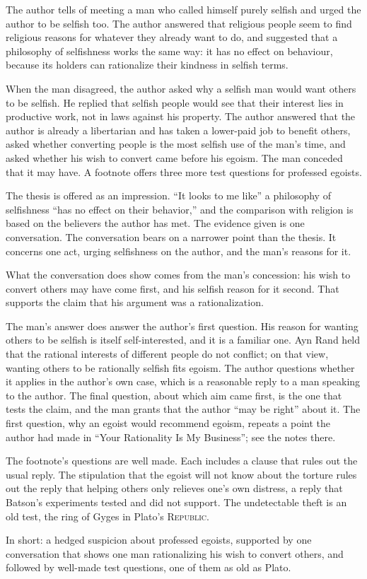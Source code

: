 \begin{afterword}
\summaryhead

The author tells of meeting a man who called himself purely selfish and urged the author to be selfish too. The author answered that religious people seem to find religious reasons for whatever they already want to do, and suggested that a philosophy of selfishness works the same way: it has no effect on behaviour, because its holders can rationalize their kindness in selfish terms.

When the man disagreed, the author asked why a selfish man would want others to be selfish. He replied that selfish people would see that their interest lies in productive work, not in laws against his property. The author answered that the author is already a libertarian and has taken a lower-paid job to benefit others, asked whether converting people is the most selfish use of the man's time, and asked whether his wish to convert came before his egoism. The man conceded that it may have. A footnote offers three more test questions for professed egoists.

\responsehead

The thesis is offered as an impression. ``It looks to me like'' a philosophy of selfishness ``has no effect on their behavior,'' and the comparison with religion is based on the believers the author has met. The evidence given is one conversation. The conversation bears on a narrower point than the thesis. It concerns one act, urging selfishness on the author, and the man's reasons for it.

What the conversation does show comes from the man's concession: his wish to convert others may have come first, and his selfish reason for it second. That supports the claim that his argument was a rationalization.

The man's answer does answer the author's first question. His reason for wanting others to be selfish is itself self-interested, and it is a familiar one. Ayn Rand held that the rational interests of different people do not conflict; on that view, wanting others to be rationally selfish fits egoism. The author questions whether it applies in the author's own case, which is a reasonable reply to a man speaking to the author. The final question, about which aim came first, is the one that tests the claim, and the man grants that the author ``may be right'' about it. The first question, why an egoist would recommend egoism, repeats a point the author had made in ``Your Rationality Is My Business''; see the notes there.

The footnote's questions are well made. Each includes a clause that rules out the usual reply. The stipulation that the egoist will not know about the torture rules out the reply that helping others only relieves one's own distress, a reply that Batson's experiments tested and did not support. The undetectable theft is an old test, the ring of Gyges in Plato's \textsc{Republic}.

In short: a hedged suspicion about professed egoists, supported by one conversation that shows one man rationalizing his wish to convert others, and followed by well-made test questions, one of them as old as Plato.
\end{afterword}
